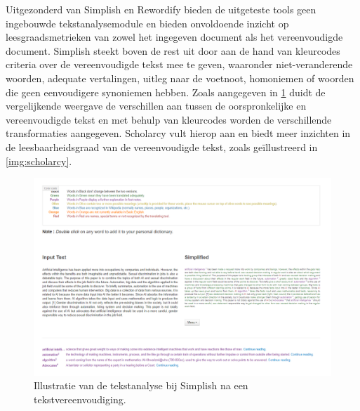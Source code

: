 \medspace

Uitgezonderd van Simplish en Rewordify bieden de uitgeteste tools geen ingebouwde tekstanalysemodule en bieden onvoldoende inzicht op leesgraadsmetrieken van zowel het ingegeven document als het vereenvoudigde document. Simplish steekt boven de rest uit door aan de hand van kleurcodes criteria over de vereenvoudigde tekst mee te geven, waaronder niet-veranderende woorden, adequate vertalingen, uitleg naar de voetnoot, homoniemen of woorden die geen eenvoudigere synoniemen hebben. Zoals aangegeven in \ref{img:simplish-output} duidt de vergelijkende weergave de verschillen aan tussen de oorspronkelijke en vereenvoudigde tekst en met behulp van kleurcodes worden de verschillende transformaties aangegeven. Scholarcy vult hierop aan en biedt meer inzichten in de leesbaarheidsgraad van de vereenvoudigde tekst, zoals geïllustreerd in \ref{img:scholarcy}.

\begin{figure}[H]
	\includegraphics[width=\linewidth]{img/simplish-output.png}
	\caption{Illustratie van de tekstanalyse bij Simplish na een tekstvereenvoudiging.}
	\label{img:simplish-output}
\end{figure}

